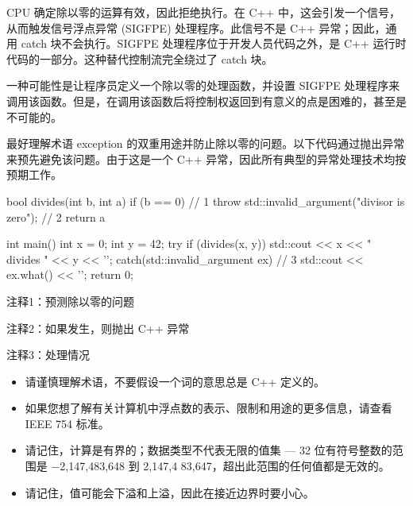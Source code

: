 CPU 确定除以零的运算有效，因此拒绝执行。在 C++ 中，这会引发一个信号，从而触发信号浮点异常 (SIGFPE) 处理程序。此信号不是 C++ 异常；因此，通用 catch 块不会执行。SIGFPE 处理程序位于开发人员代码之外，是 C++ 运行时代码的一部分。这种替代控制流完全绕过了 catch 块。

一种可能性是让程序员定义一个除以零的处理函数，并设置 SIGFPE 处理程序来调用该函数。但是，在调用该函数后将控制权返回到有意义的点是困难的，甚至是不可能的。

最好理解术语 exception 的双重用途并防止除以零的问题。以下代码通过抛出异常来预先避免该问题。由于这是一个 C++ 异常，因此所有典型的异常处理技术均按预期工作。


\begin{cpp}
bool divides(int b, int a) {
  if (b == 0) // 1
    throw std::invalid_argument("divisor is zero"); // 2
  return a %
}

int main() {
  int x = 0;
  int y = 42;
  try {
    if (divides(x, y))
      std::cout << x << " divides " << y << '\n';
  } catch(std::invalid_argument ex) { // 3
    std::cout << ex.what() << '\n';
  }
  return 0;
}
\end{cpp}

{\footnotesize
注释1：预测除以零的问题

注释2：如果发生，则抛出 C++ 异常

注释3：处理情况
}


\begin{itemize}
\item
请谨慎理解术语，不要假设一个词的意思总是 C++ 定义的。

\item
如果您想了解有关计算机中浮点数的表示、限制和用途的更多信息，请查看 IEEE 754 标准。

\item
请记住，计算是有界的；数据类型不代表无限的值集 — 32 位有符号整数的范围是 −2,147,483,648 到 2,147,4 83,647，超出此范围的任何值都是无效的。

\item
请记住，值可能会下溢和上溢，因此在接近边界时要小心。
\end{itemize}



















